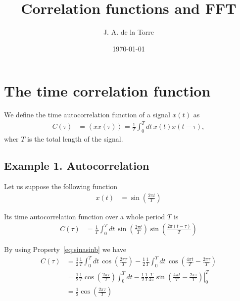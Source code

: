 \documentclass{article}
\title{Correlation functions and FFT}
\author{J. A. de la Torre}
\date{\today}
\begin{document}
\maketitle

\section{The time correlation function}
We define the time autocorrelation function of a signal $x(t)$ as
\begin{align}
  C(\tau) &= \left< x x(\tau)\right> = \frac{1}{T}\int_0^{T} dt\, x(t) x(t-\tau),
\end{align}
wher $T$ is the total length of the signal.

\subsection*{Example 1. Autocorrelation}
Let us suppose the following function
\begin{align}
  x(t)&= \sin \left( \frac{2 \pi t}{T} \right)
\end{align}

Its time autocorrelation function over a whole period $T$ is
\begin{align}
  C(\tau) &= \frac{1}{T} \int_0^{T} dt\,\sin \left( \frac{2 \pi t}{T} \right)\sin \left( \frac{2 \pi (t-\tau)}{T} \right) 
\end{align}

By using Property~\ref{eq:sinasinb} we have
\begin{align}
  C(\tau) &= \frac{1}{2} \frac{1}{T} \int_0^T dt\, \cos \left(\frac{2 \pi \tau}{T} \right)
           - \frac{1}{2} \frac{1}{T} \int_0^T dt\, \cos \left(\frac{4 \pi t}{T} - \frac{2 \pi \tau}{T} \right) \\
           &=\frac{1}{2} \frac{1}{T} \cos \left(\frac{2\pi \tau}{T}\right)  \int_{0}^{T} dt
           - \frac{1}{2} \frac{1}{T} \left. \frac{T}{4\pi} \sin \left(\frac{4\pi t}{T} - \frac{2\pi \tau}{T}\right) \right|_{0}^{T} \\
           &= \frac{1}{2} \cos \left( \frac{2 \pi \tau}{T} \right)
\end{align}
\end{document}
